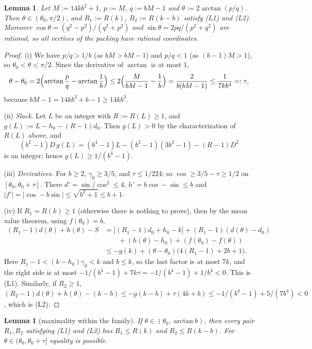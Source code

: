\documentclass[11pt]{amsart}
\newtheorem{lemma}[theorem]{Lemma}
\theoremstyle{definition}
\theoremstyle{remark}
\numberwithin{equation}{section}
\begin{document}
\begin{lemma}\label{lem:angle}
Let $M:=14kb^2+1$, $p:=M$, $q:=bM-1$ and $\theta:=2\arctan(p/q)$. Then $\theta\in(\theta_0,\pi/2)$, and $R_1:=R(k)$,
$R_2:=R(k-b)$ satisfy (L1) and (L2). Moreover $\cos\theta=(q^2-p^2)/(q^2+p^2)$ and $\sin\theta=2pq/(p^2+q^2)$ are
rational, so all vertices of the packing have rational coordinates.
\end{lemma}

\begin{proof}
(i) We have $p/q>1/b$ (as $bM>bM-1$) and $p/q<1$ (as $(b-1)M>1$), so $\theta_0<\theta<\pi/2$. Since the derivative of
$\arctan$ is at most $1$,
\[
\theta-\theta_0=2\Bigl(\arctan\frac pq-\arctan\frac1b\Bigr)\le2\Bigl(\frac{M}{bM-1}-\frac1b\Bigr)=\frac{2}{b(bM-1)}
\le\frac{1}{7kb^4}=:\tau ,
\]
because $bM-1=14kb^3+b-1\ge14kb^3$.

(ii) \emph{Slack.} Let $L$ be an integer with $R:=R(L)\ge1$, and $g(L):=L-h_0-(R-1)d_0$. Then $g(L)>0$ by the
characterization of $R(L)$ above, and
\[
(b^2-1)D\,g(L)=(b^4-1)L-(b^2-1)(3b^2-1)-(R-1)D^2
\]
is an integer; hence $g(L)\ge1/(b^4-1)$.

(iii) \emph{Derivatives.} For $b\ge2$, $\gamma_0\ge3/5$, and $\tau\le1/224$; so $\cos\ge3/5-\tau\ge1/2$ on
$[\theta_0,\theta_0+\tau]$. There $d'=\sin/\cos^2\le4$, $h'=b\cos-\sin\le b$ and $|f'|=|\cos-b\sin|\le\sqrt{b^2+1}\le b+1$.

(iv) If $R_1=R(k)\ge1$ (otherwise there is nothing to prove), then by the mean value theorem, using $f(\theta_0)=b$,
\begin{align*}
(R_1-1)d(\theta)+h(\theta)-S&=\bigl[(R_1-1)d_0+h_0-k\bigr]+(R_1-1)(d(\theta)-d_0)\\
&\qquad+(h(\theta)-h_0)+(f(\theta_0)-f(\theta))\\
&\le-g(k)+(\theta-\theta_0)\bigl(4(R_1-1)+2b+1\bigr).
\end{align*}
Here $R_1-1<(k-h_0)\gamma_0<k$ and $b\le k$, so the last factor is at most $7k$, and the right side is at most
$-1/(b^4-1)+7k\tau=-1/(b^4-1)+1/b^4<0$. This is (L1). Similarly, if $R_2\ge1$,
$(R_2-1)d(\theta)+h(\theta)-(k-b)\le-g(k-b)+\tau(4k+b)\le-1/(b^4-1)+5/(7b^4)<0$, which is (L2).
\end{proof}

\begin{lemma}[maximality within the family]\label{lem:max}
If $\theta\in(\theta_0,\arctan b)$, then every pair $R_1,R_2$ satisfying (L1) and (L2) has $R_1\le R(k)$ and
$R_2\le R(k-b)$. For $\theta\in(\theta_0,\theta_0+\tau]$ equality is possible.
\end{lemma}
\end{document}
